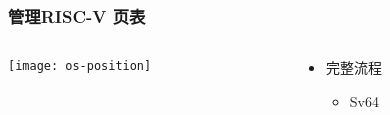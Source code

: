 \begin{frame} 
	\frametitle{管理RISC-V 页表}
	
	\begin{columns}
		
		\begin{column}{.5\textwidth}
			
			\texttt{[image: os-position]}
			
		\end{column}
		
		
		\begin{column}{.5\textwidth}
			
			\begin{itemize}\Large
				\item 完整流程
				\begin{itemize}\large
					\item Sv64
					
				\end{itemize}
			\end{itemize}
			
		\end{column}
		
		
	\end{columns}
	
\end{frame}


